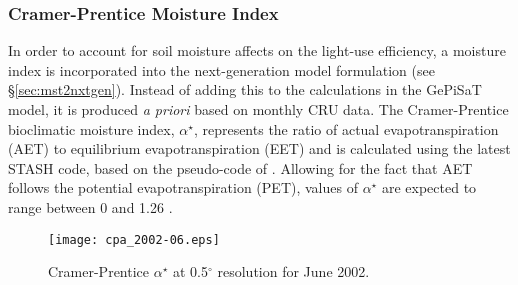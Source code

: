 \subsubsection{Cramer-Prentice Moisture Index}
\label{sec:gepcp}
In order to account for soil moisture affects on the light-use efficiency, a moisture index is incorporated into the next-generation model formulation (see \S \ref{sec:mst2nxtgen}). 
Instead of adding this to the calculations in the GePiSaT model, it is produced \textit{a priori} based on monthly CRU data.
The Cramer-Prentice bioclimatic moisture index, $\alpha^{\star}$, represents the ratio of actual evapotranspiration (AET) to equilibrium evapotranspiration (EET) \parencite{gallego-sala10} and is calculated using the latest STASH code, based on the pseudo-code of \cite{cramer88}. Allowing for the fact that AET follows the potential evapotranspiration (PET), values of $\alpha^{\star}$ are expected to range between 0 and 1.26 \parencite{lhomme97,priestley72}.
\begin{figure}[h!]
    \texttt{[image: cpa\_2002-06.eps]}
    \caption{Cramer-Prentice $\alpha^{\star}$ at 0.5$^{\circ}$ resolution for June 
    2002.}
    \label{fig:cpa}
\end{figure}

